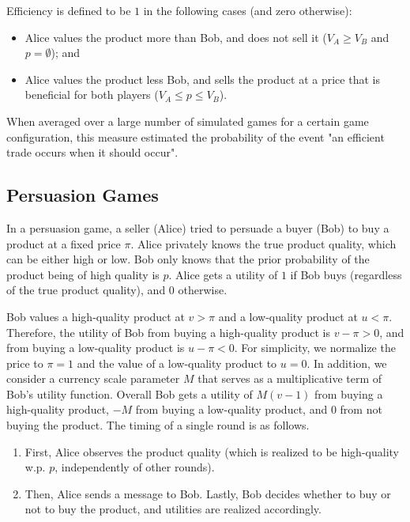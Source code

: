 \medskip
Efficiency is defined to be $1$ in the following cases (and zero otherwise): 
\begin{itemize}
    \item[(a)] Alice values the product more than Bob, and does not sell it ($V_A \ge V_B$ and $p = \emptyset$);
and 
    \item[(b)] Alice values the product less Bob, and sells the product at a price that is beneficial for both players ($V_A \le p \le V_B$).
\end{itemize}
When averaged over a large number of simulated games for a certain game configuration, this measure estimated the probability of the event "an efficient trade occurs when it should occur".

\subsection{Persuasion Games}

In a persuasion game, a seller (Alice) tried to persuade a buyer (Bob) to buy a product at a fixed price $\pi$. Alice privately knows the true product quality, which can be either high or low. Bob only knows that the prior probability of the product being of high quality is $p$. 
Alice gets a utility of $1$ if Bob buys (regardless of the true product quality), and $0$ otherwise. 

Bob values a high-quality product at $v>\pi$ and a low-quality product at $u<\pi$. Therefore, the utility of Bob from buying a high-quality product is $v-\pi>0$, and from buying a low-quality product is $u-\pi<0$. For simplicity, we normalize the price to $\pi=1$ and the value of a low-quality product to $u=0$.
In addition, we consider a currency scale parameter $M$ that serves as a multiplicative term of Bob's utility function. Overall Bob gets a utility of $M(v-1)$ from buying a high-quality product, $-M$ from buying a low-quality product, and $0$ from not buying the product.
The timing of a single round is as follows. 

\begin{enumerate}
    \item First, Alice observes the product quality (which is realized to be high-quality w.p. $p$, independently of other rounds).
    \item Then, Alice sends a message to Bob. Lastly, Bob decides whether to buy or not to buy the product, and utilities are realized accordingly.
\end{enumerate}

